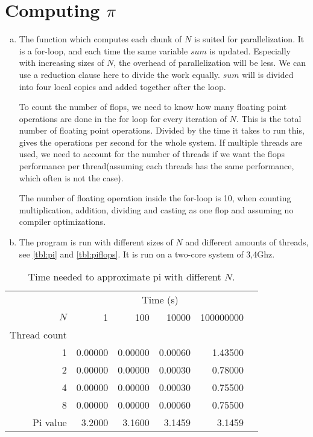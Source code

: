 \documentclass[a4paper]{article}
\begin{document}
\section{Computing $\pi$}
\begin{enumerate}[(a)]
	\item The function which computes each chunk of $N$ is suited for parallelization. It is a for-loop, and each time the same variable $sum$ is updated. Especially with increasing sizes of $N$, the overhead of parallelization will be less. We can use a reduction clause here to divide the work equally. $sum$ will is divided into four local copies and added together after the loop.
	
	To count the number of flops, we need to know how many floating point operations are done in the for loop for every iteration of $N$. This is the total number of floating point operations. Divided by the time it takes to run this, gives the operations per second for the whole system. If multiple threads are used, we need to account for the number of threads if we want the flops performance per thread(assuming each threads has the same performance, which often is not the case).
	
	The number of floating operation inside the for-loop is 10, when counting multiplication, addition, dividing and casting as one flop and assuming no compiler optimizations. 
	
	\item The program is run with different sizes of $N$ and different amounts of threads, see \autoref{tbl:pi} and \autoref{tbl:piflops}.
	It is run on a two-core system of 3,4Ghz.

\end{enumerate}
\newpage
	
	\begin{table}
		\centering
		\caption{Time needed to approximate pi with different $N$.}
		\label{tbl:pi}
		\begin{tabular}{r|r|r|r|r|r}
			& \multicolumn{4}{c}{Time (s)} \\
			$N$ & 1 & 100 & 10000 & 100000000 \\ \hline
			Thread count \\ \cline{2-5}
			 1 & 0.00000 & 0.00000 & 0.00060 &  1.43500\\
			 2 & 0.00000 & 0.00000 & 0.00030 & 0.78000 \\
			 4 & 0.00000 & 0.00000 & 0.00030 & 0.75500 \\
			 8 & 0.00000 & 0.00000 & 0.00060 & 0.75500 \\
			Pi value & 3.2000 & 3.1600 & 3.1459 & 3.1459\\
		\end{tabular}
	\end{table} 
	 
\end{document}
